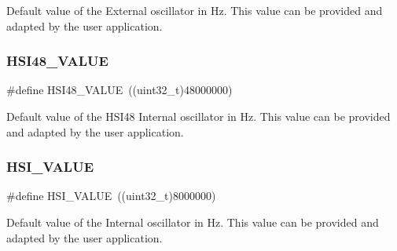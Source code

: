 Default value of the External oscillator in Hz. This value can be provided and adapted by the user application. \hypertarget{group___s_t_m32_f0xx___system___private___defines_ga47f01e5e3f2edfa94bf74c08835f3875}{}\label{group___s_t_m32_f0xx___system___private___defines_ga47f01e5e3f2edfa94bf74c08835f3875} 
\subsubsection{\texorpdfstring{H\+S\+I48\+\_\+\+V\+A\+L\+UE}{HSI48\_VALUE}}
{\footnotesize\ttfamily \#define H\+S\+I48\+\_\+\+V\+A\+L\+UE~((uint32\+\_\+t)48000000)}

Default value of the H\+S\+I48 Internal oscillator in Hz. This value can be provided and adapted by the user application. \hypertarget{group___s_t_m32_f0xx___system___private___defines_gaaa8c76e274d0f6dd2cefb5d0b17fbc37}{}\label{group___s_t_m32_f0xx___system___private___defines_gaaa8c76e274d0f6dd2cefb5d0b17fbc37} 
\subsubsection{\texorpdfstring{H\+S\+I\+\_\+\+V\+A\+L\+UE}{HSI\_VALUE}}
{\footnotesize\ttfamily \#define H\+S\+I\+\_\+\+V\+A\+L\+UE~((uint32\+\_\+t)8000000)}

Default value of the Internal oscillator in Hz. This value can be provided and adapted by the user application. 